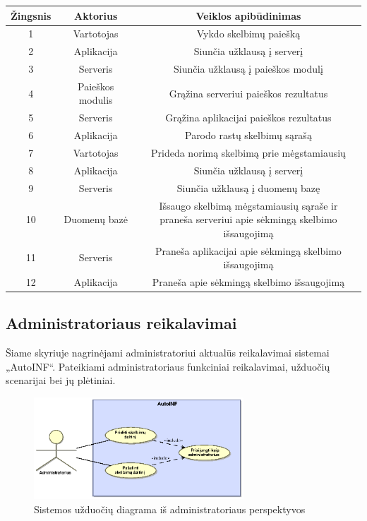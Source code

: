 \documentclass[12pt]{article}
\begin{document}
		\begin{center}
		\begin{tabular}{ | c | c | c | }
			\hline
			Žingsnis & Aktorius         & Veiklos apibūdinimas \\ \hline
			1        & Vartotojas       & Vykdo skelbimų paiešką \\ \hline
			2        & Aplikacija       & Siunčia užklausą į serverį \\ \hline
			3        & Serveris         & Siunčia užklausą į paieškos modulį \\ \hline
			4        & Paieškos modulis & Grąžina serveriui paieškos rezultatus \\ \hline
			5        & Serveris         & Grąžina aplikacijai paieškos rezultatus  \\ \hline
			6        & Aplikacija       & Parodo rastų skelbimų sąrašą \\ \hline
			7        & Vartotojas       & Prideda norimą skelbimą prie mėgstamiausių \\ \hline
			8        & Aplikacija       & Siunčia užklausą į serverį \\ \hline
			9        & Serveris         & Siunčia užklausą į duomenų bazę \\ \hline
			10       & Duomenų bazė     & \makecell{Išsaugo skelbimą mėgstamiausių sąraše ir \\ praneša serveriui apie sėkmingą skelbimo išsaugojimą} \\ \hline
			11       & Serveris         & Praneša aplikacijai apie sėkmingą skelbimo išsaugojimą \\ \hline
			12       & Aplikacija       & Praneša apie sėkmingą skelbimo išsaugojimą \\ \hline
		\end{tabular}
		\end{center}
	\pagebreak
	
	\subsection{Administratoriaus reikalavimai}
	Šiame skyriuje nagrinėjami administratoriui aktualūs reikalavimai sistemai „AutoINF“. Pateikiami administratoriaus funkciniai reikalavimai, užduočių scenarijai bei jų plėtiniai.
	
	\begin{figure}[h]
		\begin{center}
			\includegraphics[width=0.7\textwidth]{TikslaiAdministratorius.eps}
			\caption{Sistemos užduočių diagrama iš administratoriaus perspektyvos\label{UseCaseAdmin}}
		\end{center}
	\end{figure}
	\pagebreak
	
\end{document}
